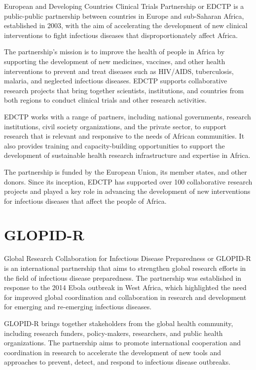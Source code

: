 \documentclass[
]{book}
\begin{document}
European and Developing Countries Clinical Trials Partnership or EDCTP is a public-public partnership between countries in Europe and sub-Saharan Africa, established in 2003, with the aim of accelerating the development of new clinical interventions to fight infectious diseases that disproportionately affect Africa.

The partnership's mission is to improve the health of people in Africa by supporting the development of new medicines, vaccines, and other health interventions to prevent and treat diseases such as HIV/AIDS, tuberculosis, malaria, and neglected infectious diseases. EDCTP supports collaborative research projects that bring together scientists, institutions, and countries from both regions to conduct clinical trials and other research activities.

EDCTP works with a range of partners, including national governments, research institutions, civil society organizations, and the private sector, to support research that is relevant and responsive to the needs of African communities. It also provides training and capacity-building opportunities to support the development of sustainable health research infrastructure and expertise in Africa.

The partnership is funded by the European Union, its member states, and other donors. Since its inception, EDCTP has supported over 100 collaborative research projects and played a key role in advancing the development of new interventions for infectious diseases that affect the people of Africa.

\hypertarget{glopidr}{%
\section{GLOPID-R}\label{glopidr}}

Global Research Collaboration for Infectious Disease Preparedness or GLOPID-R is an international partnership that aims to strengthen global research efforts in the field of infectious disease preparedness. The partnership was established in response to the 2014 Ebola outbreak in West Africa, which highlighted the need for improved global coordination and collaboration in research and development for emerging and re-emerging infectious diseases.

GLOPID-R brings together stakeholders from the global health community, including research funders, policy-makers, researchers, and public health organizations. The partnership aims to promote international cooperation and coordination in research to accelerate the development of new tools and approaches to prevent, detect, and respond to infectious disease outbreaks.
\end{document}
